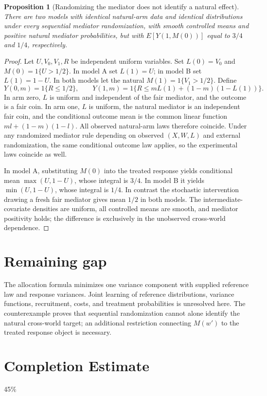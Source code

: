 \documentclass[11pt]{article}
\newtheorem{proposition}[theorem]{Proposition}
\theoremstyle{remark}
\begin{document}
\begin{proposition}[Randomizing the mediator does not identify a natural effect]
There are two models with identical natural-arm data and identical distributions under every sequential mediator randomization, with smooth controlled means and positive natural mediator probabilities, but with
$E[Y(1,M(0))]$ equal to $3/4$ and $1/4$, respectively.
\end{proposition}
\begin{proof}
Let $U,V_0,V_1,R$ be independent uniform variables. Set $L(0)=V_0$ and $M(0)=1\{U>1/2\}$. In model A set $L(1)=U$; in model B set $L(1)=1-U$. In both models let the natural $M(1)=1\{V_1>1/2\}$. Define
\[
 Y(0,m)=1\{R\le1/2\},\qquad
 Y(1,m)=1\{R\le mL(1)+(1-m)(1-L(1))\}.
\]
In arm zero, $L$ is uniform and independent of the fair mediator, and the outcome is a fair coin. In arm one, $L$ is uniform, the natural mediator is an independent fair coin, and the conditional outcome mean is the common linear function $ml+(1-m)(1-l)$. All observed natural-arm laws therefore coincide. Under any randomized mediator rule depending on observed $(X,W,L)$ and external randomization, the same conditional outcome law applies, so the experimental laws coincide as well.

In model A, substituting $M(0)$ into the treated response yields conditional mean $\max(U,1-U)$, whose integral is $3/4$. In model B it yields $\min(U,1-U)$, whose integral is $1/4$. In contrast the stochastic intervention drawing a fresh fair mediator gives mean $1/2$ in both models. The intermediate-covariate densities are uniform, all controlled means are smooth, and mediator positivity holds; the difference is exclusively in the unobserved cross-world dependence.
\end{proof}

\section*{Remaining gap}
The allocation formula minimizes one variance component with supplied reference law and response variances. Joint learning of reference distributions, variance functions, recruitment, costs, and treatment probabilities is unresolved here. The counterexample proves that sequential randomization cannot alone identify the natural cross-world target; an additional restriction connecting $M(w')$ to the treated response object is necessary.

\section{Completion Estimate}
45\%
\end{document}
